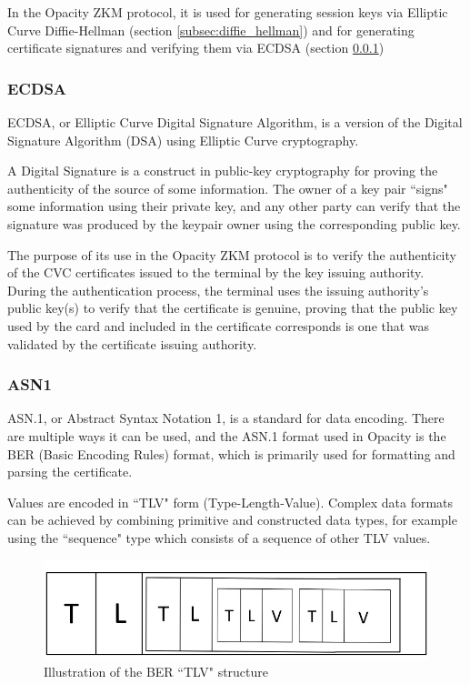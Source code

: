 \documentclass[12pt,a4paper]{article}
\begin{document}
In the Opacity ZKM protocol, it is used for generating session keys via Elliptic Curve Diffie-Hellman (section \ref{subsec:diffie_hellman}) and for generating certificate signatures and verifying them via ECDSA (section \ref{subsec:ecdsa})


\subsubsection{ECDSA}
\label{subsec:ecdsa}
ECDSA, or Elliptic Curve Digital Signature Algorithm, is a version of the Digital Signature Algorithm (DSA) using Elliptic Curve cryptography.

A Digital Signature is a construct in public-key cryptography for proving the authenticity of the source of some information. The owner of a key pair ``signs" some information using their private key, and any other party can verify that the signature was produced by the keypair owner using the corresponding public key. 


The purpose of its use in the Opacity ZKM protocol is to verify the authenticity of the CVC certificates issued to the terminal by the key issuing authority. During the authentication process, the terminal uses the issuing authority's public key(s) to verify that the certificate is genuine, proving that the public key used by the card and included in the certificate corresponds is one that was validated by the certificate issuing authority.

\subsubsection{ASN1}
ASN.1, or Abstract Syntax Notation 1, is a standard for data encoding. There are multiple ways it can be used, and the ASN.1 format used in Opacity is the BER (Basic Encoding Rules) format, which is primarily used for formatting and parsing the certificate. 

Values are encoded in ``TLV" form (Type-Length-Value). Complex data formats can be achieved by combining primitive and constructed data types, for example using the ``sequence" type which consists of a sequence of other TLV values.

\begin{figure} [ht]
	\centering
	\includegraphics[scale=0.7]{implementation/tlv}
	\caption{Illustration of the BER ``TLV" structure}
\end{figure}
\end{document}
